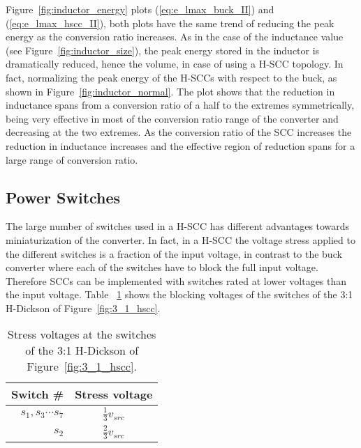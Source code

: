 Figure~\ref{fig:inductor_energy} plots (\ref{eq:e_lmax_buck_II}) and (\ref{eq:e_lmax_hscc_II}), both plots have the same trend of reducing the peak energy as the conversion ratio increases. As in the case of the inductance value (see Figure~\ref{fig:inductor_size}), the peak energy stored in the inductor is dramatically reduced, hence the volume, in case of using a H-SCC topology. In fact, normalizing the peak energy of the H-SCCs with respect to the buck, as shown in Figure~\ref{fig:inductor_normal}. The plot shows that the reduction in inductance spans from a conversion ratio of a half to the extremes symmetrically, being very effective in most of the conversion ratio range of the converter and decreasing at the two extremes. As the conversion ratio of the SCC increases the reduction in inductance increases and the effective region of reduction spans for a large range of conversion ratio.



\subsection{Power Switches}
The large number of switches used in a H-SCC has different advantages towards miniaturization of the converter. In fact, in a H-SCC the voltage stress applied to the different switches is a fraction of the input voltage, in contrast to the buck converter where each of the switches have to block the full input voltage. Therefore SCCs can be implemented with switches rated at lower voltages than the input voltage. Table ~\ref{tab:3:1 H-Dick_V_stress} shows the blocking voltages of the switches of the 3:1 H-Dickson of Figure~\ref{fig:3_1_hscc}.

\begin{table}[h]
\centering
\caption{Stress voltages at the switches of the 3:1 H-Dickson of Figure~\ref{fig:3_1_hscc}.}
\label{tab:3:1 H-Dick_V_stress}
\renewcommand{\arraystretch}{1.5}%
\begin{tabular}{r  c }
 Switch \# & Stress voltage  \\
 \midrule
 $s_1,s_3 \cdots s_7$ & $\frac{1}{3} v_{src}$ \\
 $s_2$ & $\frac{2 }{3} v_{src}$
\end{tabular}
\end{table}

